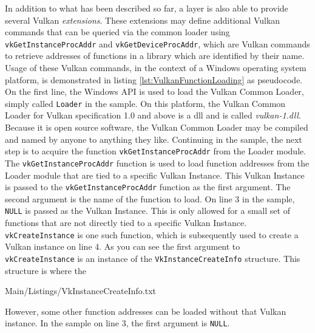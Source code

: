     In addition to what has been described so far, a layer is also able to provide several Vulkan \textit{extensions}. These extensions may define additional Vulkan commands that can be queried via the common loader using \lstinline{vkGetInstanceProcAddr} and \lstinline{vkGetDeviceProcAddr}, which are Vulkan commands to retrieve addresses of functions in a library which are identified by their name. Usage of these Vulkan commands, in the context of a Windows operating system platform, is demonstrated in listing \ref{lst:VulkanFunctionLoading} as pseudocode. On the first line, the Windows API is used to load the Vulkan Common Loader, simply called \lstinline{Loader} in the sample. On this platform, the Vulkan Common Loader for Vulkan specification 1.0 and above is a \gls{dll} and is called \textit{vulkan-1.dll}. Because it is open source software, the Vulkan Common Loader may be compiled and named by anyone to anything they like. Continuing in the sample, the next step is to acquire the function \lstinline{vkGetInstanceProcAddr} from the Loader module. The \lstinline{vkGetInstanceProcAddr} function is used to load function addresses from the Loader module that are tied to a specific Vulkan Instance. This Vulkan Instance is passed to the \lstinline{vkGetInstanceProcAddr} function as the first argument. The second argument is the name of the function to load. On line 3 in the sample, \lstinline{NULL} is passed as the Vulkan Instance. This is only allowed for a small set of functions that are not directly tied to a specific Vulkan Instance. \lstinline{vkCreateInstance} is one such function, which is subsequently used to create a Vulkan instance on line 4. As you can see the first argument to \lstinline{vkCreateInstance} is an instance of the \lstinline{VkInstanceCreateInfo} structure. This structure is where the

    
    {Main/Listings/VkInstanceCreateInfo.txt}

    However, some other function addresses can be loaded without that Vulkan instance. In the sample on line 3, the first argument is \lstinline{NULL}.



